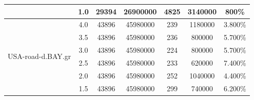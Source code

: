 \begin{table}[H]
\begin{adjustbox}{max width=\textwidth}
\begin{tabular}{|c|c|c|c|c|c|c|}
                                   & 1.0                                     & 29394                                & 26900000                                     & 4825                                   & 3140000                                        & 800\%                                                          \\ \hline
\multirow{7}{*}{USA-road-d.BAY.gr} & 4.0                                     & 43896                                & 45980000                                     & 239                                    & 1180000                                        & 3.800\%                                                        \\ \cline{2-7} 
                                   & 3.5                                     & 43896                                & 45980000                                     & 236                                    & 800000                                         & 5.700\%                                                        \\ \cline{2-7} 
                                   & 3.0                                     & 43896                                & 45980000                                     & 224                                    & 800000                                         & 5.700\%                                                        \\ \cline{2-7} 
                                   & 2.5                                     & 43896                                & 45980000                                     & 233                                    & 620000                                         & 7.400\%                                                        \\ \cline{2-7} 
                                   & 2.0                                     & 43896                                & 45980000                                     & 252                                    & 1040000                                        & 4.400\%                                                        \\ \cline{2-7} 
                                   & 1.5                                     & 43896                                & 45980000                                     & 299                                    & 740000                                         & 6.200\%                                                        \\ \cline{2-7} 

\end{tabular}
\end{adjustbox}
\end{table}
